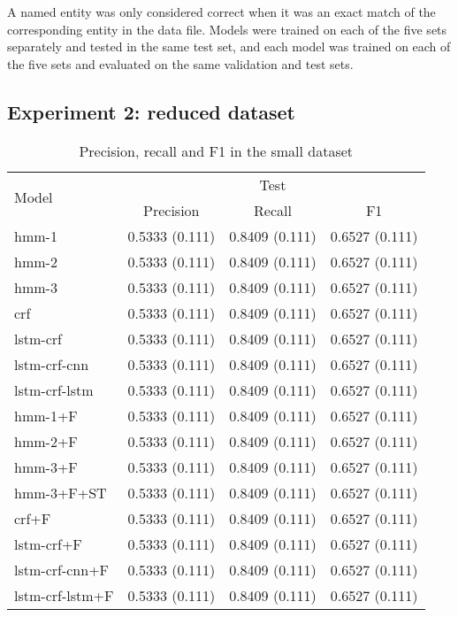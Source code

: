 \documentclass[sigconf]{acmart}
\begin{document}
A named entity was only considered correct when 
it was an exact match of the corresponding entity in the data file. 
Models were trained on each of the five sets separately and tested
in the same test set, and each model was trained on each of the five 
sets and evaluated on the same validation and test sets.

\subsection{Experiment 2: reduced dataset}

\begin{table}[h]
  \small
  \begin{center}
    \begin{tabular}{ |l|l|l|l|}
      \hline
      \multirow{2}{*}{Model} & \multicolumn{3}{c|}{Test} \\
                             & \multicolumn{1}{c}{Precision} & \multicolumn{1}{c}{Recall} & \multicolumn{1}{c|}{F1} \\
      \hline
      hmm-1           & 0.5333 (0.111) & 0.8409 (0.111) & 0.6527 (0.111) \\
      hmm-2           & 0.5333 (0.111) & 0.8409 (0.111) & 0.6527 (0.111) \\
      hmm-3           & 0.5333 (0.111) & 0.8409 (0.111) & 0.6527 (0.111) \\
      crf             & 0.5333 (0.111) & 0.8409 (0.111) & 0.6527 (0.111) \\
      lstm-crf        & 0.5333 (0.111) & 0.8409 (0.111) & 0.6527 (0.111) \\
      lstm-crf-cnn    & 0.5333 (0.111) & 0.8409 (0.111) & 0.6527 (0.111) \\
      lstm-crf-lstm   & 0.5333 (0.111) & 0.8409 (0.111) & 0.6527 (0.111) \\
      hmm-1+F         & 0.5333 (0.111) & 0.8409 (0.111) & 0.6527 (0.111) \\
      hmm-2+F         & 0.5333 (0.111) & 0.8409 (0.111) & 0.6527 (0.111) \\
      hmm-3+F         & 0.5333 (0.111) & 0.8409 (0.111) & 0.6527 (0.111) \\
      hmm-3+F+ST      & 0.5333 (0.111) & 0.8409 (0.111) & 0.6527 (0.111) \\
      crf+F           & 0.5333 (0.111) & 0.8409 (0.111) & 0.6527 (0.111) \\
      lstm-crf+F      & 0.5333 (0.111) & 0.8409 (0.111) & 0.6527 (0.111) \\
      lstm-crf-cnn+F  & 0.5333 (0.111) & 0.8409 (0.111) & 0.6527 (0.111) \\
      lstm-crf-lstm+F & 0.5333 (0.111) & 0.8409 (0.111) & 0.6527 (0.111) \\
      \hline
    \end{tabular}
  \end{center}
  \caption{Precision, recall and F1 in the small dataset}
  \label{tab:experiment2}
\end{table}
\end{document}
